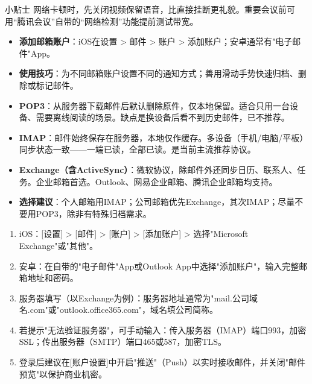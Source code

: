 \begin{tcbinfo}{小贴士}
网络卡顿时，先关闭视频保留语音，比直接挂断更礼貌。重要会议前可用“腾讯会议”自带的“网络检测”功能提前测试带宽。

\end{tcbinfo}


\begin{itemize}
  \item \textbf{添加邮箱账户}：iOS在设置 > 邮件 > 账户 > 添加账户；安卓通常有"电子邮件"App。
  \item \textbf{使用技巧}：为不同邮箱账户设置不同的通知方式；善用滑动手势快速归档、删除或标记邮件。
\end{itemize}


\begin{itemize}
  \item \textbf{POP3}：从服务器下载邮件后默认删除原件，仅本地保留。适合只用一台设备、需要离线阅读的场景。缺点是换设备后看不到历史邮件，已不推荐。
  \item \textbf{IMAP}：邮件始终保存在服务器，本地仅作缓存。多设备（手机/电脑/平板）同步状态一致——一端已读，全部已读。是当前主流推荐协议。
  \item \textbf{Exchange（含ActiveSync）}：微软协议，除邮件外还同步日历、联系人、任务。企业邮箱首选。Outlook、网易企业邮箱、腾讯企业邮箱均支持。
  \item \textbf{选择建议}：个人邮箱用IMAP；公司邮箱优先Exchange，其次IMAP；尽量不要用POP3，除非有特殊归档需求。
\end{itemize}


\begin{enumerate}
  \item iOS：[设置] > [邮件] > [账户] > [添加账户] > 选择"Microsoft Exchange"或"其他"。
  \item 安卓：在自带的"电子邮件"App或Outlook App中选择"添加账户"，输入完整邮箱地址和密码。
  \item 服务器填写（以Exchange为例）：服务器地址通常为"mail.公司域名.com"或"outlook.office365.com"，域名填公司简称。
  \item 若提示"无法验证服务器"，可手动输入：传入服务器（IMAP）端口993，加密SSL；传出服务器（SMTP）端口465或587，加密TLS。
  \item 登录后建议在[账户设置]中开启"推送"（Push）以实时接收邮件，并关闭"邮件预览"以保护商业机密。
\end{enumerate}

